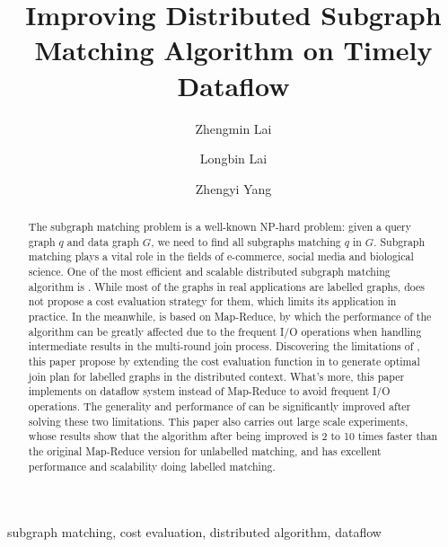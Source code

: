 \documentclass[conference]{IEEEtran}
\begin{document}
\title{Improving Distributed Subgraph Matching Algorithm on Timely Dataflow}

\author[1]{Zhengmin Lai}
\author[2]{Longbin Lai}
\author[2]{Zhengyi Yang}

\maketitle

\begin{abstract}
The subgraph matching problem is a well-known NP-hard problem: given a query graph $q$ and data graph $G$, we need to find all subgraphs matching $q$ in $G$. Subgraph matching plays a vital role in the fields of e-commerce, social media and biological science. One of the most efficient and scalable distributed subgraph matching algorithm is \cliquejoin. While most of the graphs in real applications are labelled graphs, \cliquejoin does not propose a cost evaluation strategy for them, which limits its application in practice. In the meanwhile, \cliquejoin is based on Map-Reduce, by which the performance of the algorithm can be greatly affected due to the frequent I/O operations when handling intermediate results in the multi-round join process. Discovering the limitations of \cliquejoin, this paper propose \gencliqjoin by extending the cost evaluation function in \cliquejoin to generate optimal join plan for labelled graphs in the distributed context. What's more, this paper implements \gencliqjoin on \timely dataflow system instead of Map-Reduce to avoid frequent I/O operations. The generality and performance of \cliquejoin can be significantly improved after solving these two limitations. This paper also carries out large scale experiments, whose results show that the algorithm after being improved is 2 to 10 times faster than the original Map-Reduce version for unlabelled matching, and has excellent performance and scalability doing labelled matching.
\end{abstract}

\begin{IEEEkeywords}
 subgraph matching, cost evaluation, distributed algorithm, dataflow
\end{IEEEkeywords}















\end{document}
